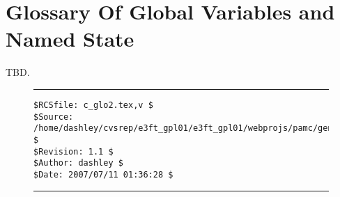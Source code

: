 
\chapter{Glossary Of Global Variables and Named State}

\label{cglo2}


TBD.




\noindent\begin{figure}[!b]
\noindent\rule[-0.25in]{\textwidth}{1pt}
\begin{tiny}
\begin{verbatim}
$RCSfile: c_glo2.tex,v $
$Source: /home/dashley/cvsrep/e3ft_gpl01/e3ft_gpl01/webprojs/pamc/gen_a/docs/manual/man_a/c_glo2/c_glo2.tex,v $
$Revision: 1.1 $
$Author: dashley $
$Date: 2007/07/11 01:36:28 $
\end{verbatim}
\end{tiny}
\noindent\rule[0.25in]{\textwidth}{1pt}
\end{figure}

%
